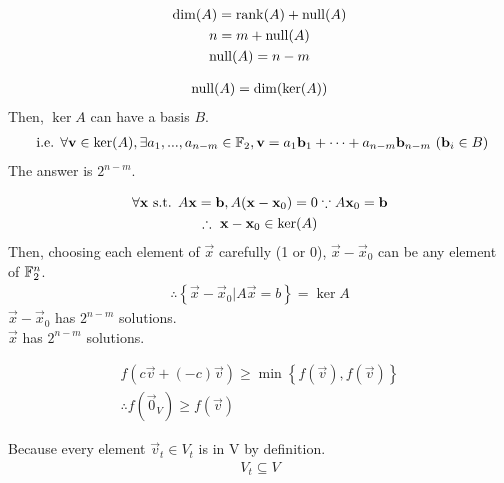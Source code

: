 \documentclass{mathtoolkit}
\begin{document}
\maketitle

\begin{p}
  \item
    \begin{subp}
      \item
        \begin{gather*}
          \mathrm{dim}(A) = \mathrm{rank}(A) + \mathrm{null}(A) \\
          n = m + \mathrm{null}(A) \\
          \mathrm{null}(A) = n - m
        \end{gather*}
      \item
        \begin{gather*}
          \mathrm{null}(A) = \mathrm{dim}(\mathrm{ker}(A))
        \end{gather*}
        Then, $\ker{A}$ can have a basis $B$.
        \begin{gather*}
          \text{i.e.} \forall \vec{v} \in \ker{A},
          \exists a_1, ..., a_{n-m} \in \field{F}_2,
          \vec{v} = a_1 \vec{b}_1 + \dots + a_{n-m} \vec{b}_{n-m}\ (\vec{b}_i \in B)
        \end{gather*}
        \therefore The answer is $2^{n-m}$.
      \item
        \begin{gather*}
          \forall \vec{x} \st A \vec{x} = \vec{b},
          A (\vec{x} - \vec{x}_0) = 0 \because A \vec{x}_0 = \vec{b} \\
          \therefore \vec{x} - \vec{x}_0 \in \ker{A}
        \end{gather*}
        Then, choosing each element of $\vec{x}$ carefully (1 or 0),
        $\vec{x} - \vec{x}_0$ can be any element of $\mathbb{F}^n_2$.
        \begin{gather*}
          \therefore \left\{ \vec{x} - \vec{x}_0 | A \vec{x} = b \right\} = \ker{A}
        \end{gather*}
        \therefore $\vec{x} - \vec{x}_0$ has $2^{n-m}$ solutions. \\
        \therefore $\vec{x}$ has $2^{n-m}$ solutions. \\
    \end{subp}

  \item
    \begin{subp}
      \item
        \begin{gather*}
          f(c \vec{v} + (-c) \vec{v}) \ge \min \left\{ f(\vec{v}), f(\vec{v}) \right\} \\
          \therefore f(\vec{0}_V) \ge f(\vec{v})
        \end{gather*}
      \item
        Because every element $\vec{v}_t \in V_t$ is in V by definition.
        \begin{gather*}
          V_t \subseteq V
        \end{gather*}
    \end{subp}


\end{p}
\end{document}
